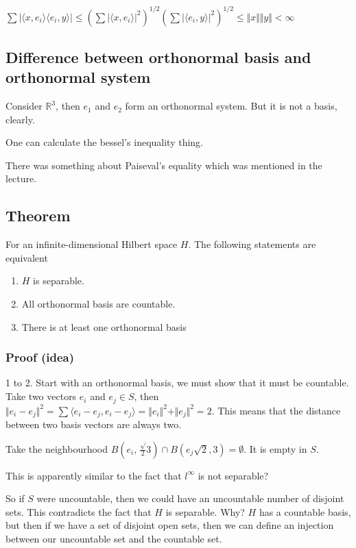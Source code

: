 \documentclass[11pt]{article}
\def\R{\mathbb{R}}
\begin{document}
\(\sum \vert \langle x, e_i \rangle \langle e_i, y\rangle \vert \le (\sum
    \vert \langle x, e_i \rangle \vert^2)^{1/2} (\sum \vert \langle e_i, y
    \rangle \vert^2)^{1/2} \le \Vert x \Vert \Vert y \Vert < \infty\)
\subsection{Difference between orthonormal basis and orthonormal system}
\label{sec:orgf76fc8a}
Consider \(\R^3\), then \(e_1\) and \(e_2\) form an orthonormal system. But it is
not a basis, clearly.

One can calculate the bessel's inequality thing.

There was something about Paiseval's equality which was mentioned in the
lecture.
\subsection{Theorem}
\label{sec:org4c73621}
For an infinite-dimensional Hilbert space \(H\). The following statements are equivalent

\begin{enumerate}
\item \(H\) is separable.
\item All orthonormal basis are countable.
\item There is at least one orthonormal basis
\end{enumerate}
\subsubsection{Proof (idea)}
\label{sec:org3edc79a}
1 to 2. Start with an orthonormal basis, we must show that it must be
countable. Take two vectors \(e_i\) and \(e_j \in S\), then \(\Vert e_i - e_j
    \Vert^2 = \sum \langle e_i - e_j, e_i - e_j\rangle= \Vert e_i\Vert^2 + \Vert
    e_j \Vert^2 = 2\). This means that the distance between two basis vectors are
always two.

Take the neighbourhood \(B(e_i, \frac\sqrt{2}{3}) \cap B(e_j \sqrt{2}, 3) =
    \emptyset\). It is empty in \(S\).

This is apparently similar to the fact that \(l^\infty\) is not separable?

So if \(S\) were uncountable, then we could have an uncountable number of
disjoint sets. This contradicts the fact that \(H\) is separable. Why? \(H\) has
a countable basis, but then if we have a set of disjoint open sets, then we
can define an injection between our uncountable set and the countable set.
\end{document}
